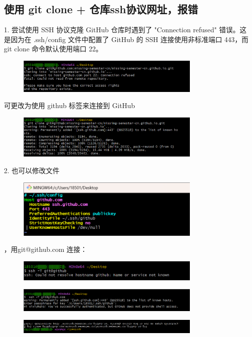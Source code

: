 \documentclass{ctexart}
\begin{document}
\subsection{使用 git clone + 仓库ssh协议网址，报错}

    1. 尝试使用 SSH 协议克隆 GitHub 仓库时遇到了 "Connection refused" 错误。这是因为在 .ssh/config 文件中配置了 GitHub 的 SSH 连接使用非标准端口 443，而 git clone 命令默认使用端口 22。
    \begin{figure}[htbp]
        \centering
        \includegraphics[width=9cm]{7.png}
        \caption{}
        \label{fig:25}
    \end{figure}
    可更改为使用 github 标签来连接到 GitHub
    \begin{figure}[htbp]
        \centering
        \includegraphics[width=9cm]{8.png}
        \caption{}
        \label{fig:26}
    \end{figure}
    \par2. 也可以修改文件
    \begin{figure}[htbp]
        \centering
        \includegraphics[width=9cm]{9.png}
        \caption{}
        \label{fig:27}
    \end{figure}
    ，用git@github.com 连接：
    \begin{figure}[H]
        \centering
        \includegraphics[width=9cm]{10.png}
        \caption{}
        \label{fig:28}
    \end{figure}
    \begin{figure}[htbp]
        \centering
        \includegraphics[width=9cm]{11.png}
        \caption{}
        \label{fig:28}
    \end{figure}
    \begin{figure}[htbp]
        \centering
        \includegraphics[width=9cm]{12.png}
        \caption{}
        \label{fig:28}
    \end{figure}
\end{document}
